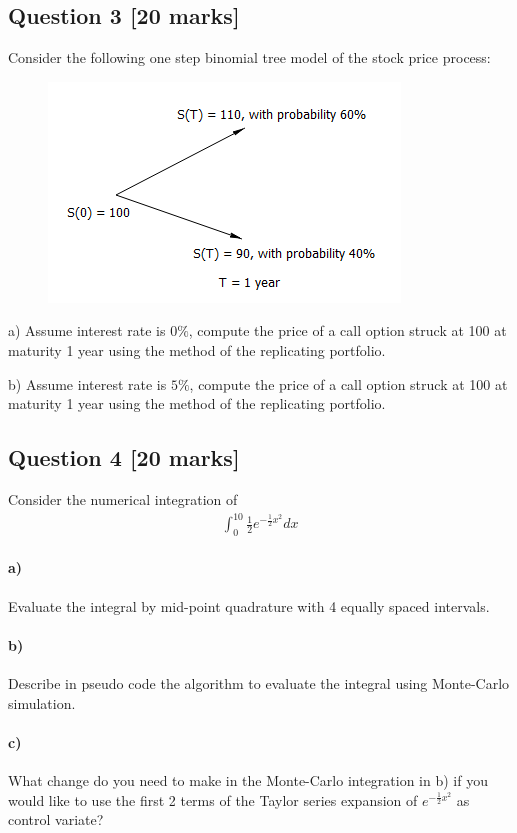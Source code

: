 \documentclass[11pt,a4paper,hidelinks,fleqn]{article}            %
\begin{document}
\subsection*{Question 3 [20 marks]}
Consider the following one step binomial tree model of the stock price process:
\begin{figure}[h]
\includegraphics[scale=0.9]{./4}
\end{figure}

a) Assume interest rate is $0\%$, compute the price of a call option struck at 100 at maturity 1 year using the method of the replicating portfolio.

b) Assume interest rate is $5\%$, compute the price of a call option struck at 100 at maturity 1 year using the method of the replicating portfolio.


\subsection*{Question 4 [20 marks]} 
Consider the numerical integration of 
\begin{align*}
\int_0^{10} \frac{1}{2} e^{-\frac12x^2} dx
\end{align*}

\paragraph{a)} Evaluate the integral by mid-point quadrature with 4 equally spaced intervals. 

\paragraph{b)} Describe in pseudo code the algorithm to evaluate the integral using Monte-Carlo simulation.
 
\paragraph{c)} What change do you need to make in the Monte-Carlo integration in b)
if you would like to use the first 2 terms of the Taylor series
expansion of $e^{-\frac12 x^2}$ as control variate?
\end{document}
